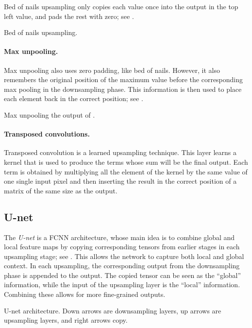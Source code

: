 Bed of nails upsampling only copies each value once into the output in the top left value, and pads
the rest with zero; see .

\begin{marginfigure}
    \centering
    \caption{Bed of nails upsampling.}
    \label{fig:bed-of-nails-upsampling}
\end{marginfigure}

\paragraph{Max unpooling.}

Max unpooling also uses zero padding, like bed of nails. However, it also remembers the original
position of the maximum value before the corresponding max pooling in the downsampling phase. This
information is then used to place each element back in the correct position; see
.

\begin{marginfigure}
    \centering
    \caption{Max unpooling the output of .}
    \label{fig:max-unpooling}
\end{marginfigure}

\paragraph{Transposed convolutions.}

Transposed convolution is a learned upsampling technique. This layer learns a kernel that is used
to produce the terms whose sum will be the final output. Each term is obtained by multiplying all
the element of the kernel by the same value of one single input pixel and then inserting the result
in the correct position of a matrix of the same size as the output.

\subsection{U-net}

The \textit{U-net} is a FCNN architecture, whose main idea is to combine global and local feature
maps by copying corresponding tensors from earlier stages in each upsampling stage; see
. This allows the network to capture both local and global context. In each
upsampling, the corresponding output from the downsampling phase is appended to the output. The
copied tensor can be seen as the ``global'' information, while the input of the upsampling layer is
the ``local'' information. Combining these allows for more fine-grained outputs.

\begin{marginfigure}
    \centering
    \caption{U-net architecture. Down arrows are downsampling layers, up arrows are upsampling layers, and right arrows copy.}
    \label{fig:u-net}
\end{marginfigure}
